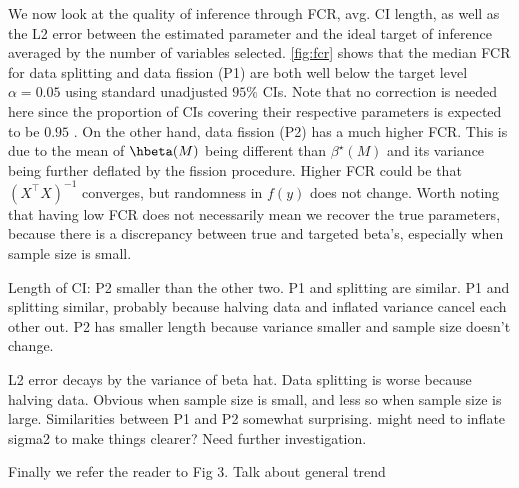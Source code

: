 We now look at the quality of inference through FCR, avg. CI length, as well as the L2 error between the estimated parameter and the ideal target of inference averaged by the number of variables selected. \cref{fig:fcr} shows that the median FCR for data splitting and data fission (P1) are both well below the target level $\alpha = 0.05$ using standard unadjusted $95\%$ CIs. Note that no correction is needed here since the proportion of CIs covering their respective parameters is expected to be $0.95$ \citep{benjamini2005false}. On the other hand, data fission (P2) has a much higher FCR. This is due to the mean of $\hbeta(M)$ being different than $\beta^\star(M)$ and its variance being further deflated by the fission procedure. Higher FCR could be that $(X^\top X)^{-1}$ converges, but randomness in $f(y)$ does not change. Worth noting that having low FCR does not necessarily mean we recover the true parameters, because there is a discrepancy between true and targeted beta's, especially when sample size is small.

Length of CI: P2 smaller than the other two. P1 and splitting are similar. P1 and splitting similar, probably because halving data and inflated variance cancel each other out. P2 has smaller length because variance smaller and sample size doesn't change.

L2 error decays by the variance of beta hat. Data splitting is worse because halving data. Obvious when sample size is small, and less so when sample size is large. Similarities between P1 and P2 somewhat surprising. might need to inflate sigma2 to make things clearer? Need further investigation.

Finally we refer the reader to Fig 3. Talk about general trend
